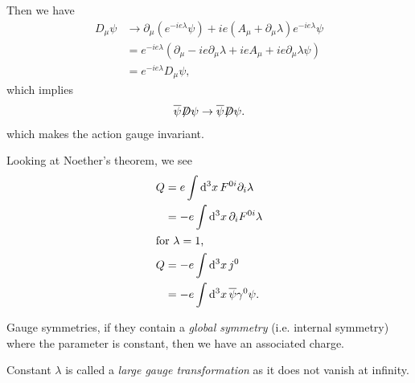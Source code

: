 Then we have
\begin{align}
    D_\mu \psi &\to \partial_\mu \left( e^{-i e \lambda} \psi \right) + i e \left( A_\mu + \partial_\mu \lambda \right) e^{-ie\lambda} \psi \\
    &= e^{-ie \lambda} \left( \partial_\mu -ie \partial_\mu \lambda + ie A_\mu + ie \partial_\mu \lambda \psi \right)  \\
    &= e^{-i e \lambda} D_{\mu}\psi 
,\end{align}
which implies
\begin{align}
    \overline{\psi} \fbs{D} \psi \to \overline{\psi}\fbs{D}\psi
.\end{align}
which makes the action gauge invariant.

Looking at Noether's theorem, we see
\begin{align}
    Q &= e\int \dd{^3x} F^{0i} \partial_i \lambda \\
    &= -e\int \dd{^3x} \partial_i F^{0i} \lambda \\
    \intertext{for $\lambda = 1$,}
    Q &= -e\int \dd{^3x} j^{0} \\
    &= -e \int \dd{^3x} \overline{\psi} \gamma^{0} \psi 
.\end{align}

Gauge symmetries, if they contain a \textit{global symmetry} (i.e. internal symmetry) where the parameter is constant, then we have an associated charge.

\begin{note}
    Constant $\lambda$ is called a \textit{large gauge transformation} as it does not vanish at infinity.
\end{note}



